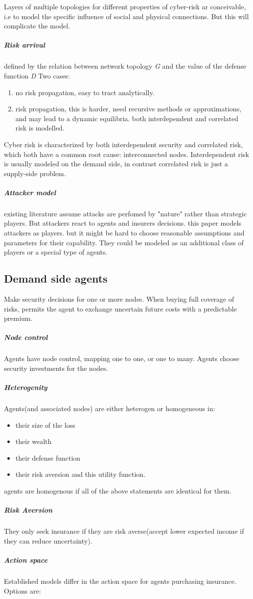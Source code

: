 Layers of multiple topologies for different properties of cyber-risk ar conceivable, 
i.e to model the specific influence of social and physical connections. But this will complicate the model.

\subparagraph{Risk arrival}
defined by the relation between network topology \textit{G} and the value of the defense
 function \textit{D}
 Two cases:
 \begin{enumerate}
 \item no risk propagation, easy to tract analytically.
 \item risk propagation, this is harder, need recursive methods or approximations, 
 and may lead to a dynamic equilibria. both interdependent and correlated risk is modelled. 
 \end{enumerate} 
Cyber risk is characterized by both interdependent security and correlated risk, 
which both have a common root cause: interconnected nodes. 
Interdependent risk is usually modeled on the demand side,
 in contrast correlated risk is just a supply-side problem.

\subparagraph{Attacker model}
existing literature assume attacks are perfomed by "nature" rather than strategic players.
 But attackers react to agents and insurers decisions. this paper models attackers as
  players. but it might be hard to choose reasonable assumptions and parameters for their capability. They could be modeled as an additional class of players or a special type of agents.
\subsection{Demand side agents}
Make security decisions for one or more nodes. When buying full coverage of risks, permits
 the agent to exchange uncertain future costs with a predictable premium. 
 \subparagraph{Node control}
 
Agents have node control, mapping one to one, or one to many. Agents choose security investments for the nodes.
\subparagraph{Heterogenity}
 Agents(and associated nodes) are either heterogen or homogeneous in:
\begin{itemize}
\item  their size of the loss
\item  their wealth
\item  their defense function
\item   their risk aversion and this utility function.
\end{itemize}
agents are homogenous if all of the above statements are identical for them.
\subparagraph{Risk Aversion} 
 They only seek insurance if they are risk averse(accept lower expected income if they can reduce uncertainty).
\subparagraph{Action space}
 Established models differ in the action space for agents purchasing insurance.
 Options are:
 
